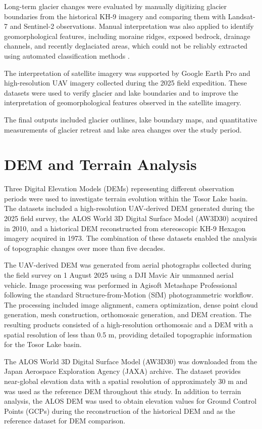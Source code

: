 \documentclass[12pt,a4paper]{report}
\begin{document}
Long-term glacier changes were evaluated by manually digitizing glacier boundaries from the historical KH-9 imagery and comparing them with Landsat-7 and Sentinel-2 observations. Manual interpretation was also applied to identify geomorphological features, including moraine ridges, exposed bedrock, drainage channels, and recently deglaciated areas, which could not be reliably extracted using automated classification methods \cite{Paul2013, Kaab2018, Bolch2010}.

The interpretation of satellite imagery was supported by Google Earth Pro and high-resolution UAV imagery collected during the 2025 field expedition. These datasets were used to verify glacier and lake boundaries and to improve the interpretation of geomorphological features observed in the satellite imagery.

The final outputs included glacier outlines, lake boundary maps, and quantitative measurements of glacier retreat and lake area changes over the study period.

\section{DEM and Terrain Analysis}

Three Digital Elevation Models (DEMs) representing different observation periods were used to investigate terrain evolution within the Tosor Lake basin. The datasets included a high-resolution UAV-derived DEM generated during the 2025 field survey, the ALOS World 3D Digital Surface Model (AW3D30) acquired in 2010, and a historical DEM reconstructed from stereoscopic KH-9 Hexagon imagery acquired in 1973. The combination of these datasets enabled the analysis of topographic changes over more than five decades.

The UAV-derived DEM was generated from aerial photographs collected during the field survey on 1 August 2025 using a DJI Mavic Air unmanned aerial vehicle. Image processing was performed in Agisoft Metashape Professional following the standard Structure-from-Motion (SfM) photogrammetric workflow. The processing included image alignment, camera optimization, dense point cloud generation, mesh construction, orthomosaic generation, and DEM creation. The resulting products consisted of a high-resolution orthomosaic and a DEM with a spatial resolution of less than 0.5 m, providing detailed topographic information for the Tosor Lake basin.

The ALOS World 3D Digital Surface Model (AW3D30) was downloaded from the Japan Aerospace Exploration Agency (JAXA) archive. The dataset provides near-global elevation data with a spatial resolution of approximately 30 m and was used as the reference DEM throughout this study. In addition to terrain analysis, the ALOS DEM was used to obtain elevation values for Ground Control Points (GCPs) during the reconstruction of the historical DEM and as the reference dataset for DEM comparison.
\end{document}
